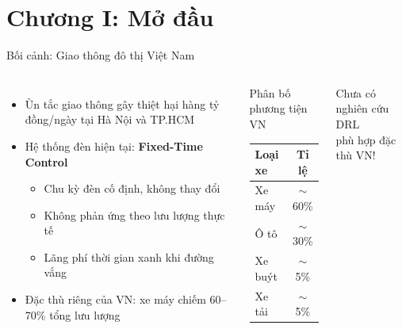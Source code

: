 \section{Chương I: Mở đầu}

\begin{frame}{Bối cảnh: Giao thông đô thị Việt Nam}
  \begin{columns}[T]
    \begin{itemize}
      \item Ùn tắc giao thông gây thiệt hại \alert{hàng tỷ đồng/ngày} tại Hà Nội và TP.HCM
      \vspace{4pt}
      \item Hệ thống đèn hiện tại: \textbf{Fixed-Time Control}
        \begin{itemize}
          \item Chu kỳ đèn cố định, không thay đổi
          \item Không phản ứng theo lưu lượng thực tế
          \item Lãng phí thời gian xanh khi đường vắng
        \end{itemize}
      \vspace{4pt}
      \item Đặc thù riêng của VN: xe máy chiếm \alert{60--70\%} tổng lưu lượng
    \end{itemize}

    \begin{block}{Phân bố phương tiện VN}
      \begin{center}
      \begin{tabular}{lc}
        \toprule
        \textbf{Loại xe} & \textbf{Tỉ lệ}\\
        \midrule
        Xe máy     & $\sim$60\%\\
        Ô tô       & $\sim$30\%\\
        Xe buýt    & $\sim$5\%\\
        Xe tải     & $\sim$5\%\\
        \bottomrule
      \end{tabular}
      \end{center}
    \end{block}
    \vspace{6pt}
    \begin{alertblock}{}
      \centering Chưa có nghiên cứu DRL\\ phù hợp đặc thù VN!
    \end{alertblock}
  \end{columns}
\end{frame}

